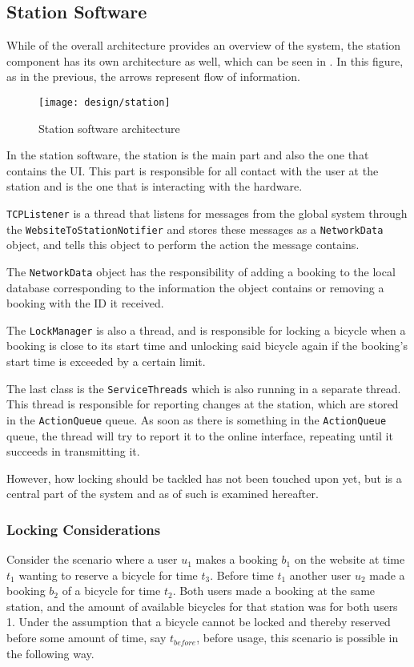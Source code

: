 \subsection{Station Software}\label{subsec:stationsoftdesfgi}
While  of the overall architecture provides an overview of the system, the station component has its own architecture as well, which can be seen in . In this figure, as in the previous, the arrows represent flow of information.

\begin{figure}[h]
	\centering
	\texttt{[image: design/station]}
	\caption{Station software architecture}\label{fig:stationarch}
\end{figure}

In the station software, the station is the main part and also the one that contains the UI. 
This part is responsible for all contact with the user at the station and is the one that is interacting with the hardware.

\texttt{TCPListener} is a thread that listens for messages from the global system through the \texttt{WebsiteToStationNotifier} and stores these messages as a \texttt{NetworkData} object, and tells this object to perform the action the message contains.

The \texttt{NetworkData} object has the responsibility of adding a booking to the local database corresponding to the information the object contains or removing a booking with the ID it received.

The \texttt{LockManager} is also a thread, and is responsible for locking a bicycle when a booking is close to its start time and unlocking said bicycle again if the booking's start time is exceeded by a certain limit.

The last class is the \texttt{ServiceThreads} which is also running in a separate thread.
This thread is responsible for reporting changes at the station, which are stored in the \texttt{ActionQueue} queue.
As soon as there is something in the \texttt{ActionQueue} queue, the thread will try to report it to the online interface, repeating until it succeeds in transmitting it.

However, how locking should be tackled has not been touched upon yet, but is a  central part of the system and as of such is examined hereafter.

\subsubsection{Locking Considerations}\label{subsec:lockingcons}
Consider the scenario where a user $u_1$ makes a booking $b_1$ on the website at time $t_1$ wanting to reserve a bicycle for time $t_3$. Before time $t_1$ another user $u_2$ made a booking $b_2$ of a bicycle for time $t_2$. Both users made a booking at the same station, and the amount of available bicycles for that station was for both users 1. Under the assumption that a bicycle cannot be locked and thereby reserved before some amount of time, say $t_{before}$, before usage, this scenario is possible in the following way.

